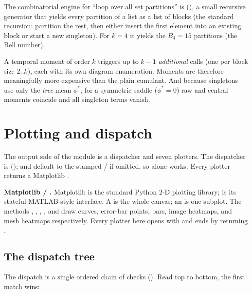 The combinatorial engine for ``loop over all set partitions'' is
 (), a small
recursive generator that yields every partition of a list as a list of blocks
(the standard recursion: partition the rest, then either insert the first element
into an existing block or start a new singleton). For $k=4$ it yields the
$B_4=15$ partitions (the Bell number).

\begin{gotcha}
A temporal moment of order $k$ triggers up to $k-1$ \emph{additional}
 calls (one per block size $2..k$), each with its own
diagram enumeration. Moments are therefore meaningfully more expensive than the
plain cumulant. And because singletons use only the \emph{tree} mean $\phi^{*}$,
for a symmetric saddle ($\phi^{*}=0$) raw and central moments coincide and all
singleton terms vanish.
\end{gotcha}

\section{Plotting and dispatch}\label{sec:plot}

The output side of the module is a dispatcher and seven plotters. The dispatcher
is 
();  and  default to the
stamped / if omitted, so 
alone works. Every plotter returns a Matplotlib .

\begin{defn}
\textbf{Matplotlib  / .} Matplotlib is the standard
Python 2-D plotting library;  is its stateful MATLAB-style interface. A
 is the whole canvas; an  is one subplot. The methods
, , , , and
 draw curves, error-bar points, bars, image heatmaps, and
mesh heatmaps respectively. Every plotter here opens with
 and ends by returning .
\end{defn}

\subsection{The dispatch tree}

The dispatch is a single ordered chain of checks
(). Read top to bottom, the first match wins:

